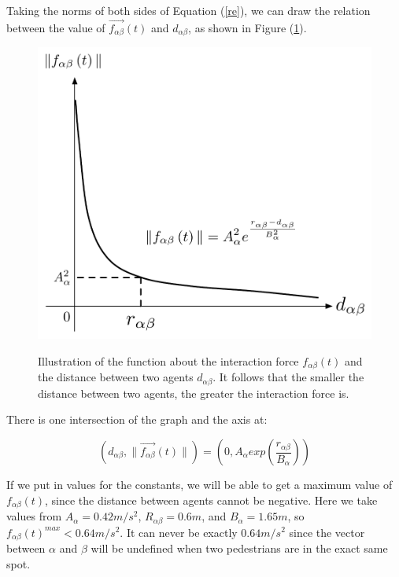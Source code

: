 Taking the norms of both sides of Equation (\ref{re}), we can draw the relation between the value of $\overrightarrow{f_{\alpha\beta}}(t)$ and $ d_{\alpha\beta} $, as shown in Figure 
(\ref{fig:physicalinteraction2}).\\

\begin{figure}[hb]
    \centering
    {\includegraphics[scale=0.45]{Figures/physicalinteraction.pdf}} 
    \caption[Psysical interaction]{Illustration of the function about the interaction force 
        $f_{\alpha\beta}(t)$ and the distance between two agents
        $d_{\alpha \beta}$. It follows that the smaller the distance between two agents, the greater the interaction force is. }
    \label{fig:physicalinteraction2}
\end{figure}

There is one intersection of the graph and the  axis at:

\begin{equation}
	\left( d_{\alpha \beta} , \| \vec{f_{\alpha \beta}} \left( t \right) \| \right)
 =
	\left( 0 , A_{\alpha} exp\left( \frac{r_{\alpha\beta} }{B_{\alpha}}\right)  \right) 
\end{equation}

If we put in values for the constants, we will be able to get a maximum value of $ f_{\alpha\beta}(t) $, 
since the distance between agents cannot be negative. Here we take values from \cite{ABconstant} $ A_{\alpha} = 0.42 m/s^{2} $, 
$ R_{\alpha\beta} = 0.6 m $, and $ B_{\alpha} = 1.65 m $, so 
$ f_{\alpha\beta}(t)^{max} < 0.64 m/s^{2} $. It can never be exactly $0.64m/s^2$ since the vector between $\alpha$ and $\beta$ will be undefined when two pedestrians are in the exact same spot.

